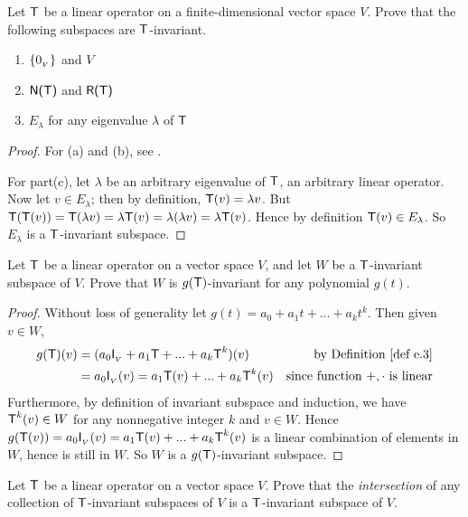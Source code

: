 \begin{exercise} \label{exercise 5.4.3}
Let \(\textsf{T}\) be a linear operator on a finite-dimensional vector space \(V\).
Prove that the following subspaces are \(\textsf{T}\)-invariant.
\begin{enumerate}
\item \(\{ 0_{_V} \}\) and \(V\)
\item \(\textsf{N(T)}\) and \(\textsf{R(T)}\)
\item \(E_{\lambda}\) for any eigenvalue \(\lambda\) of \(\textsf{T}\)
\end{enumerate}
\end{exercise}

\begin{proof}
For (a) and (b), see .

For part(c), let \(\lambda\) be an arbitrary eigenvalue of \(\textsf{T}\), an arbitrary linear operator.
Now let \(v \in E_{\lambda}\); then by definition, \(\textsf{T}(v) = \lambda v\).
But \(\textsf{T}(\textsf{T}(v)) = \textsf{T}(\lambda v) = \lambda \textsf{T}(v) = \lambda (\lambda v) = \lambda \textsf{T}(v)\).
Hence by definition \(\textsf{T}(v) \in E_{\lambda}\).
So \(E_{\lambda}\) is a \(\textsf{T}\)-invariant subspace.
\end{proof}

\begin{exercise} \label{exercise 5.4.4}
Let \(\textsf{T}\) be a linear operator on a vector space \(V\), and let \(W\) be a \(\textsf{T}\)-invariant subspace of \(V\).
Prove that \(W\) is \(g(\textsf{T})\)-invariant for any polynomial \(g(t)\).
\end{exercise}

\begin{proof}
Without loss of generality let \(g(t) = a_0 + a_1 t + ... + a_k t^k\).
Then given \(v \in W\),
\begin{align*}
    g(\T)(v) & = (a_0 \ITRANV{} + a_1 \T + ... + a_k \T^k)(v) & \text{by \DEF{e.3}} \\
        & = a_0 \ITRANV{}(v) = a_1 \T(v) + ... + a_k \T^k(v) & \text{since function \(+, \cdot\) is linear}
\end{align*}
Furthermore, by definition of invariant subspace and induction, we have \(\textsf{T}^k(v) \in W\) for any nonnegative integer \(k\) and \(v \in W\).
Hence \(g(\textsf{T}(v)) = a_0 \textsf{I}_{_V}{}(v) = a_1 \textsf{T}(v) + ... + a_k \textsf{T}^k(v)\) is a linear combination of elements in \(W\), hence is still in \(W\).
So \(W\) is a \(g(\textsf{T})\)-invariant subspace.
\end{proof}

\begin{exercise} \label{exercise 5.4.5}
Let \(\textsf{T}\) be a linear operator on a vector space \(V\).
Prove that the \emph{intersection} of any collection of \(\textsf{T}\)-invariant subspaces of \(V\) is a \(\textsf{T}\)-invariant subspace of \(V\).
\end{exercise}

